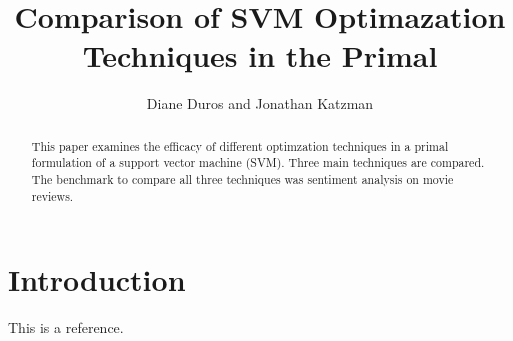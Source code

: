\documentclass[letterpaper, 11pt]{article}
\begin{document}
\title{Comparison of SVM Optimazation Techniques in the Primal}
\author{Diane Duros and Jonathan Katzman}
\maketitle
\begin{abstract}This paper examines the efficacy of different optimzation techniques in a primal formulation of a support vector machine (SVM).  Three main techniques are compared.  The benchmark to compare all three techniques was sentiment analysis on movie reviews.
\end{abstract}
                                                                                                                                                                                                                                                                           
\section{Introduction}
This is a reference.\cite{chapelle2007training}\cite{melacci2011laplacian}\cite{rupnik2008stochastic}



 

\end{document}
